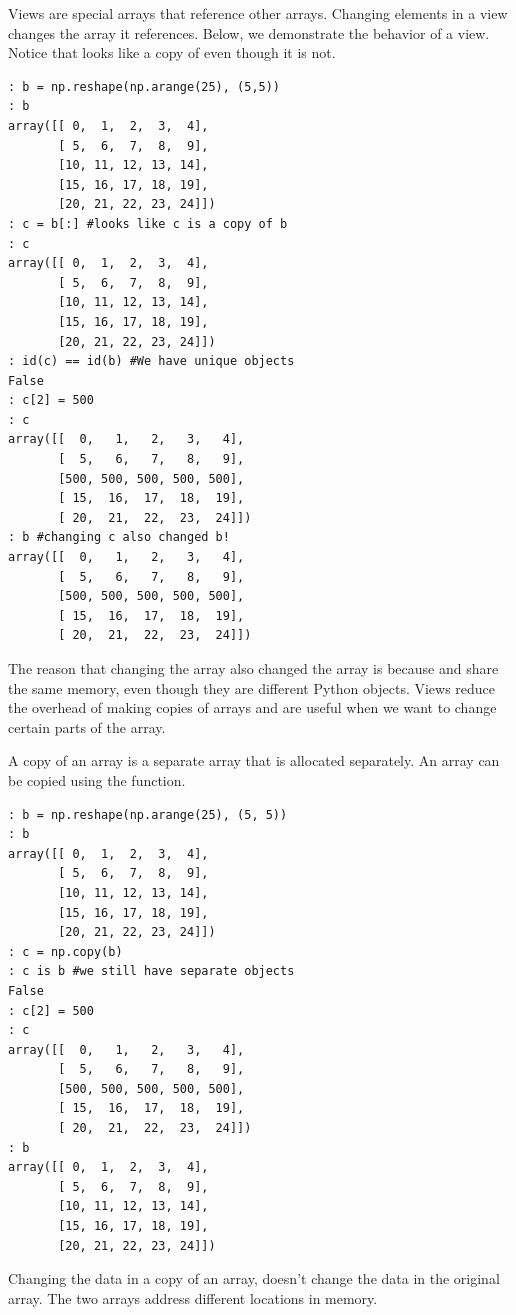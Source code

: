 Views are special arrays that reference other arrays.
Changing elements in a view changes the array it references.
Below, we demonstrate the behavior of a view.
Notice that  looks like a copy of  even though it is not.
\begin{lstlisting}
: b = np.reshape(np.arange(25), (5,5))
: b
array([[ 0,  1,  2,  3,  4],
       [ 5,  6,  7,  8,  9],
       [10, 11, 12, 13, 14],
       [15, 16, 17, 18, 19],
       [20, 21, 22, 23, 24]])
: c = b[:] #looks like c is a copy of b
: c
array([[ 0,  1,  2,  3,  4],
       [ 5,  6,  7,  8,  9],
       [10, 11, 12, 13, 14],
       [15, 16, 17, 18, 19],
       [20, 21, 22, 23, 24]])
: id(c) == id(b) #We have unique objects
False
: c[2] = 500
: c
array([[  0,   1,   2,   3,   4],
       [  5,   6,   7,   8,   9],
       [500, 500, 500, 500, 500],
       [ 15,  16,  17,  18,  19],
       [ 20,  21,  22,  23,  24]])
: b #changing c also changed b!
array([[  0,   1,   2,   3,   4],
       [  5,   6,   7,   8,   9],
       [500, 500, 500, 500, 500],
       [ 15,  16,  17,  18,  19],
       [ 20,  21,  22,  23,  24]])
\end{lstlisting}
The reason that changing the array  also changed the array  is because  and  share the same memory, even though they are different Python objects.
Views reduce the overhead of making copies of arrays and are useful when we want to change certain parts of the array.

A copy of an array is a separate array that is allocated separately.
An array can be copied using the  function.
\begin{lstlisting}
: b = np.reshape(np.arange(25), (5, 5))
: b
array([[ 0,  1,  2,  3,  4],
       [ 5,  6,  7,  8,  9],
       [10, 11, 12, 13, 14],
       [15, 16, 17, 18, 19],
       [20, 21, 22, 23, 24]])
: c = np.copy(b)
: c is b #we still have separate objects
False
: c[2] = 500
: c
array([[  0,   1,   2,   3,   4],
       [  5,   6,   7,   8,   9],
       [500, 500, 500, 500, 500],
       [ 15,  16,  17,  18,  19],
       [ 20,  21,  22,  23,  24]])
: b
array([[ 0,  1,  2,  3,  4],
       [ 5,  6,  7,  8,  9],
       [10, 11, 12, 13, 14],
       [15, 16, 17, 18, 19],
       [20, 21, 22, 23, 24]])
\end{lstlisting}
Changing the data in a copy of an array, doesn't change the data in the original array.
The two arrays address different locations in memory.

